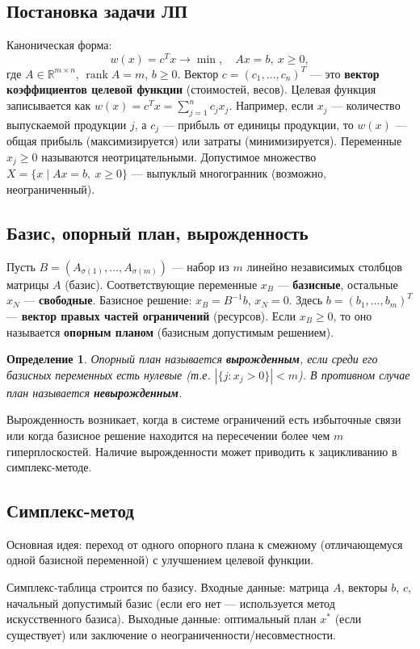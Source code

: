 \documentclass{article}
\theoremstyle{plain}
\newtheorem{definition}[theorem]{Определение}
\begin{document}
\subsection{Постановка задачи ЛП}
Каноническая форма:
\[
w(x) = c^T x \to \min,\quad Ax = b,\ x \ge 0,
\]
где $A \in \mathbb{R}^{m \times n}$, $\operatorname{rank} A = m$, $b \ge 0$. 
Вектор $c = (c_1,\dots,c_n)^T$ — это \textbf{вектор коэффициентов целевой функции} (стоимостей, весов). Целевая функция записывается как $w(x)=c^T x = \sum_{j=1}^n c_j x_j$. Например, если $x_j$ — количество выпускаемой продукции $j$, а $c_j$ — прибыль от единицы продукции, то $w(x)$ — общая прибыль (максимизируется) или затраты (минимизируется). Переменные $x_j \ge 0$ называются неотрицательными. Допустимое множество $X = \{x \mid Ax = b,\ x \ge 0\}$ — выпуклый многогранник (возможно, неограниченный).

\subsection{Базис, опорный план, вырожденность}
Пусть $B = (A_{\sigma(1)},\dots,A_{\sigma(m)})$ — набор из $m$ линейно независимых столбцов матрицы $A$ (базис). Соответствующие переменные $x_B$ — \textbf{базисные}, остальные $x_N$ — \textbf{свободные}. Базисное решение: $x_B = B^{-1}b$, $x_N = 0$. Здесь $b = (b_1,\dots,b_m)^T$ — \textbf{вектор правых частей ограничений} (ресурсов). Если $x_B \ge 0$, то оно называется \textbf{опорным планом} (базисным допустимым решением).

\begin{definition}
Опорный план называется \textbf{вырожденным}, если среди его базисных переменных есть нулевые (т.е. $|\{j: x_j > 0\}| < m$). В противном случае план называется \textbf{невырожденным}.
\end{definition}
Вырожденность возникает, когда в системе ограничений есть избыточные связи или когда базисное решение находится на пересечении более чем $m$ гиперплоскостей. Наличие вырожденности может приводить к зацикливанию в симплекс-методе.

\subsection{Симплекс-метод}
Основная идея: переход от одного опорного плана к смежному (отличающемуся одной базисной переменной) с улучшением целевой функции.

Симплекс-таблица строится по базису. Входные данные: матрица $A$, векторы $b$, $c$, начальный допустимый базис (если его нет — используется метод искусственного базиса). Выходные данные: оптимальный план $x^*$ (если существует) или заключение о неограниченности/несовместности.
\end{document}
